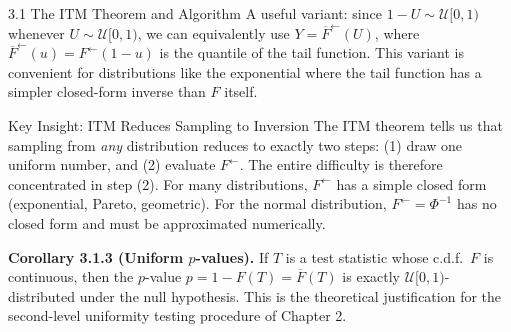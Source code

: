 \documentclass[aspectratio=169,10pt]{beamer}
\newcommand{\UU}{\mathcal{U}}
\newcommand{\FInv}{F^{\leftarrow}}
\begin{document}
\begin{frame}[allowframebreaks]{3.1 The ITM Theorem and Algorithm}
A useful variant: since $1 - U \sim \UU[0,1)$ whenever $U \sim \UU[0,1)$,
we can equivalently use $Y = \overline{F}^{\leftarrow}(U)$, where
$\overline{F}^{\leftarrow}(u) = \FInv(1 - u)$ is the quantile of the tail
function.  This variant is convenient for distributions like the exponential
where the tail function has a simpler closed-form inverse than $F$ itself.

\begin{alertblock}{Key Insight: ITM Reduces Sampling to Inversion}
  The ITM theorem tells us that sampling from \emph{any} distribution reduces
  to exactly two steps: (1) draw one uniform number, and (2) evaluate $\FInv$.
  The entire difficulty is therefore concentrated in step (2).
  For many distributions, $\FInv$ has a simple closed form (exponential, Pareto,
  geometric).  For the normal distribution, $\FInv = \Phi^{-1}$ has no closed
  form and must be approximated numerically.
\end{alertblock}

\textbf{Corollary 3.1.3 (Uniform $p$-values).}
If $T$ is a test statistic whose c.d.f.\ $F$ is continuous, then the
$p$-value $p = 1 - F(T) = \overline{F}(T)$ is exactly $\UU[0,1)$-distributed
under the null hypothesis.  This is the theoretical justification for the
second-level uniformity testing procedure of Chapter 2.

\end{frame}
\end{document}
